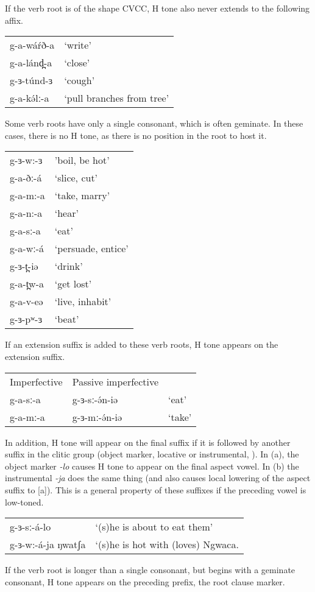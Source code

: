 If the verb root is of the shape CVCC, H tone also never extends to the following affix. 

\ea 
\begin{tabular}[t]{ll}
g-a-wáŕð-a	&	‘write’\\
g-a-lánd̪-a	&	‘close’\\
g-ɜ-túnd-ɜ	&	‘cough’\\
g-a-kə́lː-a	&	‘pull branches from tree’\\	
\end{tabular}
\z

Some verb roots have only a single consonant, which is often geminate. In these cases, there is no H tone, as there is no position in the root to host it. 

\ea  
\begin{tabular}[t]{ll} %
g-ɜ-w:-ɜ	&	'boil, be hot' \\
g-a-ðː-á	&	‘slice, cut’\\
g-a-m:-a	&	‘take, marry’\\
g-a-n:-a	&	‘hear’\\
g-a-sː-a	&	‘eat’\\
g-a-wː-á	&	‘persuade, entice’\\
g-ɜ-t̪-iə	&	‘drink’\\
g-a-t̪w-a	&	‘get lost’\\
g-a-v-eə	&	‘live, inhabit’\\
g-ɜ-pʷ-ɜ	&	‘beat’
\end{tabular}
\z 
If an extension suffix is added to these verb roots, H tone appears on the extension suffix. 

\ea 
\begin{tabular}[t]{lll}
Imperfective	&	Passive imperfective 	\\
g-a-sː-a 	&	g-ɜ-sː-ə́n-iə	&	‘eat’\\
g-a-mː-a	&	g-ɜ-mː-ə́n-iə	&	‘take’\\ 	
\end{tabular}
\z 
In addition, H tone will appear on the final suffix if it is followed by another suffix in the clitic group (object marker, locative or instrumental, ). In (a), the object marker \textit{-lo} causes H tone to appear on the final aspect vowel. In (b) the instrumental \textit{-ja} does the same thing (and also causes local lowering of the aspect suffix to [a]). This is a general property of these suffixes if the preceding vowel is low-toned. 

\ea  	
\begin{tabular}[t]{ll}
g-ɜ-sː-á-lo			&	‘(s)he is about to eat them’\\
g-ɜ-w:-á-ja ŋwatʃa	&	‘(s)he is hot with (loves) Ngwaca.\\ 
\end{tabular}
\z 
If the verb root is longer than a single consonant, but begins with a geminate consonant, H tone appears on the preceding prefix, the root clause marker. 

